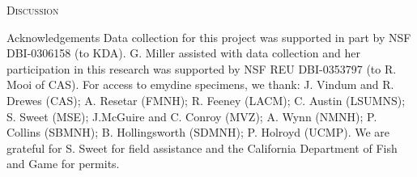 \documentclass[12pt,letterpaper]{article}
\renewcommand{\section}[1]{%
\bigskip
\begin{center}
\begin{Large}
\normalfont\scshape #1
\medskip
\end{Large}
\end{center}}
\begin{document}
\section{Discussion}



\section*{Acknowledgements}
Data collection for this project was supported in part by NSF DBI-0306158 (to KDA). G. Miller assisted with data collection and her participation in this research was supported by NSF REU DBI-0353797 (to R. Mooi of CAS). For access to emydine specimens, we thank: J. Vindum and R. Drewes (CAS); A. Resetar (FMNH); R. Feeney (LACM); C. Austin (LSUMNS); S. Sweet (MSE); J.McGuire and C. Conroy (MVZ); A. Wynn (NMNH); P. Collins (SBMNH); B. Hollingsworth (SDMNH); P. Holroyd (UCMP). We are grateful for S. Sweet for field assistance and the California Department of Fish and Game for permits.



\end{document}
